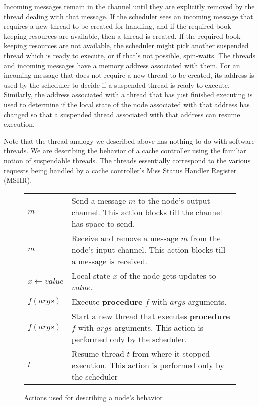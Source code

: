 Incoming messages remain in the channel until they are explicitly removed by
the thread dealing with that message. If the scheduler sees an incoming message
that requires a new thread to be created for handling, and if the required
book-keeping resources are available, then a thread is created.
If the
required book-keeping resources are not available, the scheduler might pick
another suspended thread which is ready to execute, or if that's not possible,
spin-waits.  The threads and incoming messages have a memory address associated
with them. For an incoming message that does not require a new thread to be
created, its address is used by the scheduler to decide if a suspended thread
is ready to execute. Similarly, the address associated with a thread that has
just finished executing is used to determine if the local state of the node
associated with that address has changed so that a suspended thread associated
with that address can resume execution.  

Note that the thread analogy we described above has nothing to do with software
threads. We are describing the behavior of a cache controller using the familiar
notion of suspendable threads. The threads essentially correspond to the various
requests being handled by a cache controller's Miss Status Handler Register
(MSHR).

\begin{figure}
\begin{tabularx}{\linewidth}{|l|X|}
\hline
\send{} $m$ & Send a message $m$ to the node's output channel. This action
blocks till the channel has space to send.\\
\receive{} $m$ & Receive and remove a message $m$ from the node's input channel.
This action blocks till a message is received.\\
$x \gets value$ & Local state $x$ of the node gets updates to $value$.\\
\call{} $f(args)$ & Execute \textbf{procedure} $f$ with $args$ arguments.\\
\start{} $f(args)$ & Start a new thread that executes \textbf{procedure} $f$
with $args$ arguments. This action is performed only by the scheduler.\\
\resume{} $t$ & Resume thread $t$ from where it stopped execution. This action
is performed only by the scheduler\\
\hline
\end{tabularx}
\caption{Actions used for describing a node's behavior}
\label{actions}
\end{figure}

